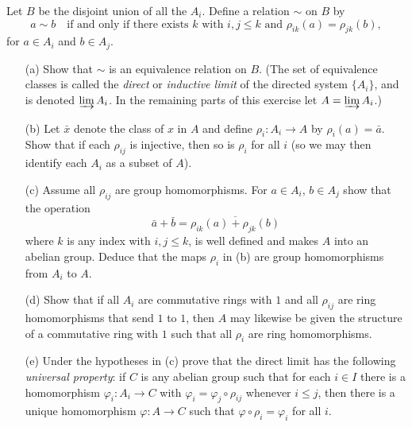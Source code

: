\documentclass{article}
\theoremstyle{definition}
\theoremstyle{remark}
\begin{document}
Let $B$ be the disjoint union of all the $A_i$. Define a relation $\sim$ on $B$ by
\[
a \sim b \quad \text{if and only if there exists } k \text{ with } i, j \le k \text{ and } \rho_{ik}(a) = \rho_{jk}(b),
\]
for $a \in A_i$ and $b \in A_j$.

\begin{enumerate}
    \item[(a)] Show that $\sim$ is an equivalence relation on $B$. (The set of equivalence classes is called the \textit{direct} or \textit{inductive limit} of the directed system $\{A_i\}$, and is denoted $\varinjlim A_i$. In the remaining parts of this exercise let $A = \varinjlim A_i$.)
    
    \item[(b)] Let $\bar{x}$ denote the class of $x$ in $A$ and define $\rho_i : A_i \to A$ by $\rho_i(a) = \bar{a}$. Show that if each $\rho_{ij}$ is injective, then so is $\rho_i$ for all $i$ (so we may then identify each $A_i$ as a subset of $A$).
    
    \item[(c)] Assume all $\rho_{ij}$ are group homomorphisms. For $a \in A_i$, $b \in A_j$ show that the operation
    \[
    \bar{a} + \bar{b} =\overline{\rho_{ik}(a) + \rho_{jk}(b)}
    \]
    where $k$ is any index with $i, j \le k$, is well defined and makes $A$ into an abelian group. Deduce that the maps $\rho_i$ in (b) are group homomorphisms from $A_i$ to $A$.
    
    \item[(d)] Show that if all $A_i$ are commutative rings with $1$ and all $\rho_{ij}$ are ring homomorphisms that send $1$ to $1$, then $A$ may likewise be given the structure of a commutative ring with $1$ such that all $\rho_i$ are ring homomorphisms.
    
    \item[(e)] Under the hypotheses in (c) prove that the direct limit has the following \textit{universal property}: if $C$ is any abelian group such that for each $i \in I$ there is a homomorphism $\varphi_i : A_i \to C$ with $\varphi_i = \varphi_j \circ \rho_{ij}$ whenever $i \le j$, then there is a unique homomorphism $\varphi : A \to C$ such that $\varphi \circ \rho_i = \varphi_i$ for all $i$.
\end{enumerate}
\end{document}
